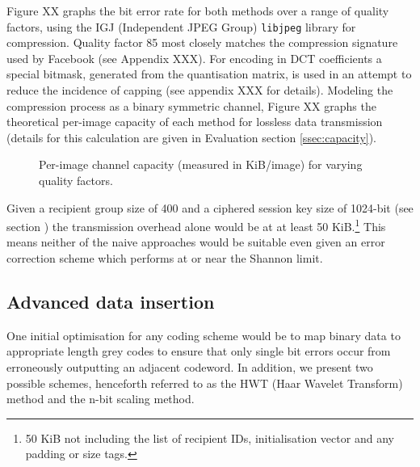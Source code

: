 Figure XX graphs the bit error rate for both methods over a range of quality factors, using the IGJ (Independent JPEG Group) {\tt libjpeg} library for compression. Quality factor 85 most closely matches the compression signature used by Facebook (see Appendix XXX). For encoding in DCT coefficients a special bitmask, generated from the quantisation matrix, is used in an attempt to reduce the incidence of capping (see appendix XXX for details). Modeling the compression process as a binary symmetric channel, Figure XX graphs the theoretical per-image capacity of each method for lossless data transmission (details for this calculation are given in Evaluation section \ref{ssec:capacity}).


\begin{figure}[tbph]
  \begin{center}
    \caption{Per-image channel capacity (measured in KiB/image) for varying quality factors.}
    \label{graph:capacity0}
  \end{center}
\end{figure}

Given a recipient group size of 400 and a ciphered session key size of 1024-bit (see section \label{ssec:keys}) the transmission overhead alone would be at at least 50 KiB.\footnote{50 KiB not including the list of recipient IDs, initialisation vector and any padding or size tags.} This means neither of the naive approaches would be suitable even given an error correction scheme which performs at or near the Shannon limit. 


\subsection{Advanced data insertion}

One initial optimisation for any coding scheme would be to map binary data to appropriate length grey codes to ensure that only single bit errors occur from erroneously outputting an adjacent codeword. In addition, we present two possible schemes, henceforth referred to as the HWT (Haar Wavelet Transform) method and the n-bit scaling method.

